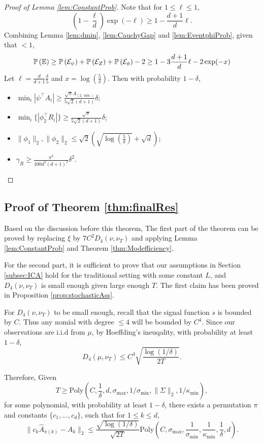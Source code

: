 \begin{proof}[Proof of Lemma \ref{lem:ConstantProb}]
Note that for $1\le \ell \le 1$, 
\[
\left(1- \frac{\ell}{d}\right)\exp(-\ell) \ge 1-\frac{d+1}{d}\ell.
\]
Combining Lemma \ref{lem:dmin}, \ref{lem:CauchyGap} and \ref{lem:EventphiProb}, given that $<1$,
\[
\mathbb{P}\left(\mathbb{E}\right) \ge \mathbb{P}\left(\mathcal{E}_{\psi}\right) + \mathbb{P}\left(\mathcal{E}_{Z}\right) + \mathbb{P}\left(\mathcal{E}_{\phi}\right) -2 \ge 1- 3\frac{d+1}{d}\ell- 2\exp(-x)  
\]
Let $\ell = \frac{d}{d+1}\frac{\delta}{5}$ and $ x= \log(\frac{5}{\delta})$.
Then with probability $1-\delta$, 
\begin{itemize}
\item $\min_i |\psi^{\top}A_i| \ge \frac{\sqrt{\pi}A_{(2,\min)}}{5\sqrt{2}(d+1)} \delta$;
\item $\min_i \{|\phi_2^{\top}R_i|\} \ge \frac{\sqrt{\pi}}{5\sqrt{2}(d+1)}\delta$;
\item $\|\phi_1\|_2, \|\phi_2\|_2 \le \sqrt{2}\left(\sqrt{\log(\frac{5}{\delta})}+\sqrt{d}\right)$;
\item $\gamma_R \ge\frac{\pi^2}{100d^2(d+1)^2}\delta^2$.
\end{itemize}
\end{proof}

\subsection{Proof of Theorem \ref{thm:finalRes}}
Based on the discussion before this theorem, The first part of the theorem can be proved by replacing $\xi$ by $7C^2D_4(\nu,\nu_T)$ and applying Lemma \ref{lem:ConstantProb} and Theorem \ref{thm:Modefficiency}. 

For the second part, it is sufficient to prove that our assumptions in Section \ref{subsec:ICA} hold for the traditional setting with some constant $L$, and $D_4(\nu, \nu_T)$ is small enough given large enough $T$.
The first claim has been proved in Proposition \ref{prop:stochasticAss}. 

For $D_4(\nu, \nu_T)$ to be small enough, recall that the signal function $s$ is bounded by $C$. 
Thus any nomial with degree $\le 4$ will be bounded by $C^4$. Since our observations are i.i.d from $\mu$, by Hoeffding's ineuqality, with probability at least $1-\delta$, 
\[
D_4(\mu, \nu_T) \le  C^4\sqrt{\frac{\log(1/\delta)}{2T}}.
\]

Therefore, Given 
\[
T \ge \text{Poly}\left(C, \frac{1}{\delta}, d,  \sigma_{\max}, 1/\sigma_{\min}, \|\Sigma\|_2, 1/\kappa_{\min}\right),
\]
for some polynomial, with probability at least $1-\delta$, there exists a permutation $\pi$ and constants $\{c_1,\ldots,c_d\}$, such that for $1\le k\le d$,
\[
\| c_k\hat{A}_{\pi(k)} - A_k\|_2 \le \frac{\sqrt{\log(1/\delta)}}{\sqrt{2T}}\text{Poly}(C, \sigma_{\max}, \frac{1}{\sigma_{\min}}, \frac{1}{\kappa_{\min}},\frac{1}{\delta}, d).
\]

